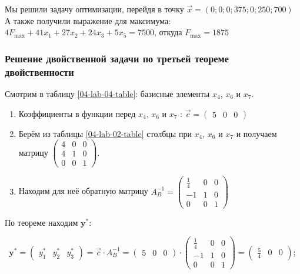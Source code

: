 Мы решили задачу оптимизации, перейдя в точку $\overrightarrow{x} = \left(0; 0; 0; 375; 0; 250; 700\right)$
А также получили выражение для максимума: $ 4F_{ \max} + 41x_1 + 27x_2 + 24x_3 + 5x_5 = 7500 $, откуда $ F_{ \max} = 1875 $ 

\subsubsection{Решение двойственной задачи по третьей теореме двойственности}

Смотрим в таблицу \ref{04-lab-04-table}: базисные элементы $ x_4 $, $ x_6 $ и $ x_7 $.

\begin{enumerate}
    \item Коэффициенты в функции перед $ x_4 $, $ x_6 $ и $ x_7 $ : $ \overrightarrow{c} = \begin{pmatrix}
        5 & 0 & 0
    \end{pmatrix} $
    \item Берём из таблицы \ref{04-lab-02-table} столбцы при $ x_4 $, $ x_6 $ и $ x_7 $ и получаем матрицу 
    $ 
    \begin{pmatrix}
        4 & 0 & 0 \\
        4 & 1 & 0\\
        0 & 0 & 1 
    \end{pmatrix} 
    $.\\
    \item Находим для неё обратную матрицу $ A^{ -1}_{ B} = \begin{pmatrix}
        \frac{ 1}{ 4}   & 0 & 0\\
        -1 & 1 & 0\\
        0 & 0 & 1
    \end{pmatrix} $
\end{enumerate}

По теореме находим $ \mathbf{y^*}  $:

\[ \mathbf{y^*}= \begin{pmatrix}
    y_1^* & y_2^* & y_3^*
\end{pmatrix}= \overrightarrow{c} \cdot A_B^{ -1} = \begin{pmatrix}
    5 & 0 & 0
\end{pmatrix} \cdot 
\begin{pmatrix}
    \frac{ 1}{ 4}   & 0 & 0\\
    -1 & 1 & 0\\
    0 & 0 & 1
\end{pmatrix} = \begin{pmatrix}
        \frac{ 5}{ 4} & 0 & 0
    \end{pmatrix}
;\]

